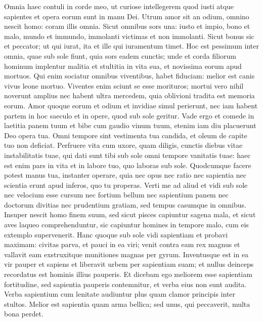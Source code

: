 \begin{biblechapter}  
\verse Omnia haec contuli in corde meo, ut curiose intellegerem quod iusti atque sapientes et opera eorum sunt in manu Dei. Utrum amor sit an odium, omnino nescit homo: coram illis omnia. 
\verse Sicut omnibus sors una: iusto et impio, bono et malo, mundo et immundo, immolanti victimas et non immolanti. Sicut bonus sic et peccator; ut qui iurat, ita et ille qui iuramentum timet. 
\verse Hoc est pessimum inter omnia, quae sub sole fiunt, quia sors eadem cunctis; unde et corda filiorum hominum implentur malitia et stultitia in vita sua, et novissima eorum apud mortuos. 
\verse Qui enim sociatur omnibus viventibus, habet fiduciam: melior est canis vivus leone mortuo. 
\verse Viventes enim sciunt se esse morituros; mortui vero nihil noverunt amplius nec habent ultra mercedem, quia oblivioni tradita est memoria eorum. 
\verse Amor quoque eorum et odium et invidiae simul perierunt, nec iam habent partem in hoc saeculo et in opere, quod sub sole geritur. 
\verse Vade ergo et comede in laetitia panem tuum et bibe cum gaudio vinum tuum, etenim iam diu placuerunt Deo opera tua. 
\verse Omni tempore sint vestimenta tua candida, et oleum de capite tuo non deficiat. 
\verse Perfruere vita cum uxore, quam diligis, cunctis diebus vitae instabilitatis tuae, qui dati sunt tibi sub sole omni tempore vanitatis tuae: haec est enim pars in vita et in labore tuo, quo laboras sub sole. 
\verse Quodcumque facere potest manus tua, instanter operare, quia nec opus nec ratio nec sapientia nec scientia erunt apud inferos, quo tu properas. 
\verse Verti me ad aliud et vidi sub sole nec velocium esse cursum nec fortium bellum nec sapientium panem nec doctorum divitias nec prudentium gratiam, sed tempus casumque in omnibus. 
\verse Insuper nescit homo finem suum, sed sicut pisces capiuntur sagena mala, et sicut aves laqueo comprehenduntur, sic capiuntur homines in tempore malo, cum eis extemplo supervenerit. 
\verse Hanc quoque sub sole vidi sapientiam et probavi maximam: 
\verse civitas parva, et pauci in ea viri; venit contra eam rex magnus et vallavit eam exstruxitque munitiones magnas per gyrum. 
\verse Inventusque est in ea vir pauper et sapiens et liberavit urbem per sapientiam suam; et nullus deinceps recordatus est hominis illius pauperis. 
\verse Et dicebam ego meliorem esse sapientiam fortitudine, sed sapientia pauperis contemnitur, et verba eius non sunt audita. 
\verse Verba sapientium cum lenitate audiuntur plus quam clamor principis inter stultos. 
\verse Melior est sapientia quam arma bellica; sed unus, qui peccaverit, multa bona perdet. 
\end{biblechapter}

